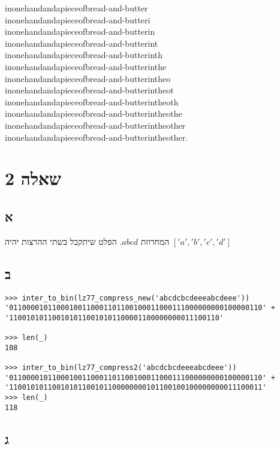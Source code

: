 \documentclass{article}
\begin{document}
inonehandandapieceofbread-and-butter\\
inonehandandapieceofbread-and-butteri\\
inonehandandapieceofbread-and-butterin\\
inonehandandapieceofbread-and-butterint\\
inonehandandapieceofbread-and-butterinth\\
inonehandandapieceofbread-and-butterinthe\\
inonehandandapieceofbread-and-butterintheo\\
inonehandandapieceofbread-and-butterintheot\\
inonehandandapieceofbread-and-butterintheoth\\
inonehandandapieceofbread-and-butterintheothe\\
inonehandandapieceofbread-and-butterintheother\\
inonehandandapieceofbread-and-butterintheother.\\

\section*{שאלה 2}

\subsection*{א}

המחרוזת $abcd$.
הפלט שיתקבל בשתי ההרצות יהיה $['a', 'b', 'c', 'd']$

\subsection*{ב}

\begin{lstlisting}
>>> inter_to_bin(lz77_compress_new('abcdcbcdeeeabcdeee'))
'01100001011000100110001101100100011000111000000000100000110' + '1100101011001010110010101100001100000000011100110'

>>> len(_)
108

>>> inter_to_bin(lz77_compress2('abcdcbcdeeeabcdeee'))
'01100001011000100110001101100100011000111000000000100000110' + '11001010110010101100101100000000101100100100000000011100011'
>>> len(_)
118
\end{lstlisting}


\subsection*{ג}
\end{document}
